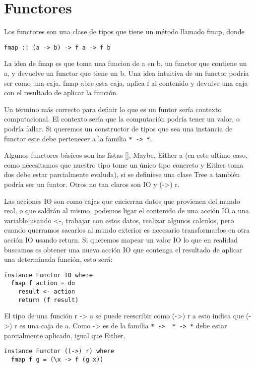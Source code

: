 \section{Functores} %
\label{sec:functores}

Los functores son una clase de tipos que tiene un método llamado fmap, donde

\begin{lstlisting}
fmap :: (a -> b) -> f a -> f b
\end{lstlisting}

La idea de fmap es que toma una funcion de a en b, un functor que contiene un a, y devuelve un functor que tiene un b. Una idea intuitiva de un functor podría ser como una caja, fmap abre esta caja, aplica f al contenido y devulve una caja con el resultado de aplicar la función.

Un término más correcto para definir lo que es un funtor sería contexto computacional. El contexto sería que la computación podría tener un valor, o podría fallar. Si queremos un constructor de tipos que sea una instancia de functor este debe pertenecer a la familia \lstinline$* -> *$.

Algunos functores básicos son las listas [], Maybe, Either a (en este ultimo caso, como necesitamos que nuestro tipo tome un único tipo concreto y Either toma dos debe estar parcialmente evaluda), si se definiese una clase Tree a también podría ser un funtor. Otros no tan claros son IO y (->) r.

Las acciones IO son como cajas que encierran datos que provienen del mundo real, o que saldrán al mismo, podemos ligar el contenido de una acción IO a una variable usando <-, trabajar con estos datos, realizar algunos calculos, pero cuando querramos sacarlos al mundo exterior es necesario transformarlos en otra acción IO usando return. Si queremos mapear un valor IO  lo que en realidad buscamos es obtener una nueva acción IO que contenga el resultado de aplicar una determinada función, esto será:

\begin{lstlisting}
instance Functor IO where
  fmap f action = do
    result <- action
    return (f result)
\end{lstlisting}

El tipo de una función r -> a se puede reescribir como (->) r a esto indica que (->) r es una caja de a. Como -> es de la familia \lstinline$* ->  * -> *$ debe estar parcialmente aplicado, igual que Either.

\begin{lstlisting}
instance Functor ((->) r) where
  fmap f g = (\x -> f (g x))
\end{lstlisting}

